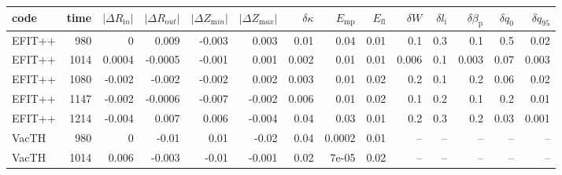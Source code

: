 \begin{table}
\centering
\small
\begin{tabular}{lrrrrrrrrrrrrr}
\toprule
   code &  time &  $\left| \Delta R_{\mathrm in} \right|$ &  $\left| \Delta R_{\mathrm out} \right|$ &  $\left| \Delta Z_{\mathrm min} \right|$ &  $\left| \Delta Z_{\mathrm max} \right|$ &  $\delta \kappa$ &  $E_\mathrm{mp}$ &  $E_\mathrm{fl}$ &  $\delta W$ &  $\delta l_{\mathrm i}$ &  $\delta \beta_{\mathrm p}$ &  $\delta q_0$ &  $\delta q_{95}$ \\
\midrule
 EFIT++ &    980 &               0 &            0.009 &       -0.003 &        0.003 &                   0.01 &        0.04 &        0.01 &           0.1 &            0.3 &               0.1 &            0.5 &            0.02 \\
 EFIT++ &   1014 &          0.0004 &          -0.0005 &       -0.001 &        0.001 &                  0.002 &        0.01 &        0.01 &         0.006 &            0.1 &             0.003 &           0.07 &           0.003 \\
 EFIT++ &   1080 &          -0.002 &           -0.002 &       -0.002 &        0.002 &                  0.003 &        0.01 &        0.02 &           0.2 &            0.1 &               0.2 &           0.06 &            0.02 \\
 EFIT++ &   1147 &          -0.002 &          -0.0006 &       -0.007 &       -0.002 &                  0.006 &        0.01 &        0.02 &           0.1 &            0.2 &               0.1 &            0.2 &            0.01 \\
 EFIT++ &   1214 &          -0.004 &            0.007 &        0.006 &       -0.004 &                   0.04 &        0.03 &        0.01 &           0.2 &            0.3 &               0.2 &           0.03 &           0.001 \\
  VacTH &    980 &               0 &            -0.01 &         0.01 &        -0.02 &                   0.04 &      0.0002 &        0.01 &           -- &            -- &               -- &            -- &             -- \\
  VacTH &   1014 &           0.006 &           -0.003 &        -0.01 &       -0.001 &                   0.02 &       7e-05 &        0.02 &           -- &            -- &               -- &            -- &             -- \\

\end{tabular}
\end{table}
